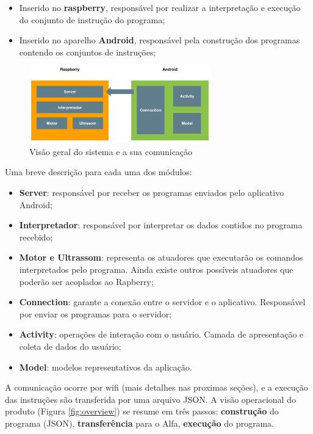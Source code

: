 \begin{itemize}
\item Inserido no \textbf{raspberry}, responsável por realizar a interpretação e execução do conjunto de instrução do programa;
\item Inserido no aparelho \textbf{Android}, responsável pela construção dos programas contendo os conjuntos de instruções;
\end{itemize}

\begin{figure}[H]
    \centering
    \includegraphics[width=0.7\textwidth]{figuras/overview_down.eps}
    \caption{Visão geral do sistema e a sua comunicação}
    \label{fig:overview_down}
\end{figure}

Uma breve descrição para cada uma dos módulos:
\begin{itemize}
    \item \textbf{Server}: responsável por receber os programas enviados pelo aplicativo Android;
    \item \textbf{Interpretador}: responsável por interpretar os dados contidos no programa recebido;
    \item \textbf{Motor e Ultrassom}: representa os atuadores que executarão os comandos interpretados pelo programa. Ainda existe outros
    possíveis atuadores que poderão ser acoplados ao Rapberry;
    \item \textbf{Connection}: garante a conexão entre o servidor e o aplicativo. Responsável por enviar os programas para o servidor;
    \item \textbf{Activity}: operações de interação com o usuário. Camada de apresentação e coleta de dados do usuário;
    \item \textbf{Model}: modelos representativos da aplicação.
\end{itemize}

A comunicação ocorre por wifi (mais detalhes nas proximas seções), e a execução das instruções são transferida por uma arquivo JSON.
A visão operacional do produto (Figura \ref{fig:overview}) se resume em três passos: \textbf{construção} do programa (JSON), \textbf{transferência}
para o Alfa, \textbf{execução} do programa.


